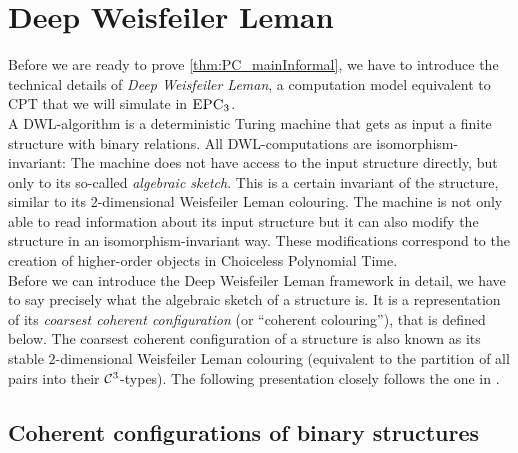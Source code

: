 \documentclass[10pt,a4paper]{article}
\newcommand{\EPC}{\mbox{\sc EPC}}
\newcommand{\Cc}{{\cal C}}
\begin{document}
	\section{Deep Weisfeiler Leman}
	\label{sec:dwl}
	Before we are ready to prove \autoref{thm:PC_mainInformal}, we have to introduce the technical details of \emph{Deep Weisfeiler Leman}, a computation model equivalent to CPT that we will simulate in $\EPC_3$.\\
	A DWL-algorithm is a deterministic Turing machine that gets as input a finite structure with binary relations. All DWL-computations are isomorphism-invariant: The machine does not have access to the input structure directly, but only to its so-called \emph{algebraic sketch}. This is a certain invariant of the structure, similar to its $2$-dimensional Weisfeiler Leman colouring. The machine is not only able to read information about its input structure but it can also modify the structure in an isomorphism-invariant way. These modifications correspond to the creation of higher-order objects in Choiceless Polynomial Time.\\
	Before we can introduce the Deep Weisfeiler Leman framework in detail, we have to say precisely what the algebraic sketch of a structure is. It is a representation of its \emph{coarsest coherent configuration} (or ``coherent colouring''), that is defined below. The coarsest coherent configuration of a structure is also known as its stable $2$-dimensional Weisfeiler Leman colouring (equivalent to the partition of all pairs into their $\Cc^3$-types). 
	The following presentation closely follows the one in \cite{dwl}. 
	
	\subsection{Coherent configurations of binary structures}
	\label{sec:preliminariesDWL}
	
\end{document}

